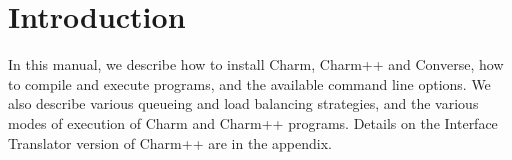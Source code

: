 \newpage
\pagestyle{headings}

\section{Introduction}
In this manual, we describe how to install Charm, Charm++ and
Converse, how to compile and execute programs, and the available
command line options.  We also describe various queueing and load balancing
strategies, and the various modes of execution of Charm and Charm++
programs.  Details on the Interface Translator version of Charm++ are
in the appendix.





\appendix



